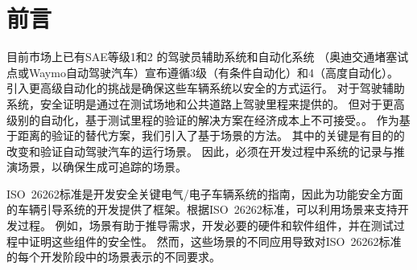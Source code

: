 \section{前言}
目前市场上已有SAE等级1和2 \cite {SAE2016}的驾驶员辅助系统和自动化系统
（奥迪交通堵塞试点\cite{noauthor_techday_nodate}或Waymo自动驾驶汽车\cite{hawkins_waymo_2017}）宣布遵循3级（有条件自动化）和4（高度自动化）。
引入更高级自动化的挑战是确保这些车辆系统以安全的方式运行。
对于驾驶辅助系统，安全证明是通过在测试场地和公共道路上驾驶里程来提供的。
但对于更高级别的自动化，基于测试里程的验证的解决方案在经济成本上不可接受。\cite{wachenfeld_release_2016}。
作为基于距离的验证的替代方案，我们引入了基于场景的方法。
其中的关键是有目的的改变和验证自动驾驶汽车的运行场景。
因此，必须在开发过程中系统的记录与推演场景，以确保生成可追踪的场景。

ISO~26262标准是开发安全关键电气/电子车辆系统的指南，因此为功能安全方面的车辆引导系统的开发提供了框架。根据ISO~26262标准，可以利用场景来支持开发过程。
例如，场景有助于推导需求，开发必要的硬件和软件组件，并在测试过程中证明这些组件的安全性。
然而，这些场景的不同应用导致对ISO~26262标准的每个开发阶段中的场景表示的不同要求。

